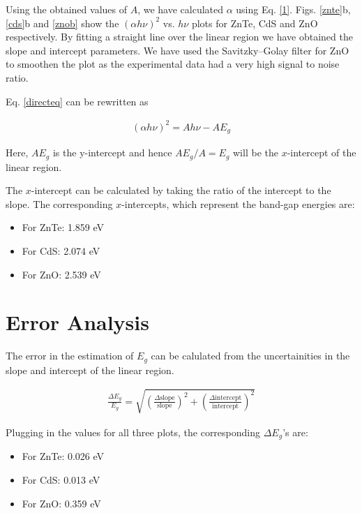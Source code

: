 Using the obtained values of $A$, we have calculated $\alpha$ using Eq. \ref{1}. Figs. \ref{znte}b, \ref{cds}b and \ref{znob} show the $(\alpha h \nu)^{2}$ vs. $h\nu$ plots for ZnTe, CdS and ZnO respectively.  By fitting a straight line over the linear region we have obtained the slope and intercept parameters. We have used the Savitzky–Golay filter for ZnO to smoothen the plot as the experimental data had a very high signal to noise ratio. 

Eq. \ref{directeq} can be rewritten as

\begin{align}
    (\alpha h \nu)^{2} = Ah\nu - AE_g
\end{align}

Here, $AE_g$ is the y-intercept and hence $AE_g/A=E_g$ will be the $x$-intercept of the linear region.

The $x$-intercept can be calculated by taking the ratio of the intercept to the slope. The corresponding $x$-intercepts, which represent the band-gap energies are:

\begin{itemize}
    \item For ZnTe: 1.859 eV
    \item For CdS: 2.074 eV
    \item For ZnO: 2.539 eV
\end{itemize}

\section{Error Analysis}

The error in the estimation of $E_g$ can be calulated from the uncertainities in the slope and intercept of the linear region.

\begin{align}
\frac{\Delta E_g}{E_g} = \sqrt{\left(\frac{\Delta \text{slope}}{\text{slope}}\right)^2 + \left(\frac{\Delta \text{intercept}}{\text{intercept}}\right)^2}
\end{align}

Plugging in the values for all three plots, the corresponding $\Delta E_g$'s are:
\begin{itemize}
    \item For ZnTe: 0.026 eV
    \item For CdS: 0.013 eV
    \item For ZnO: 0.359 eV
\end{itemize}
